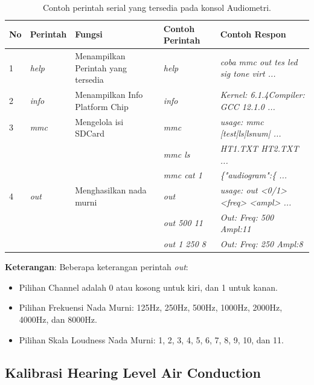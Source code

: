 \documentclass{article}
\begin{document}
	\begin{table}[H]
		\renewcommand{\tablename}{Tabel}
		\centering
		\caption{Contoh perintah serial yang tersedia pada konsol Audiometri.}
		\begin{tabular}{| p{} | p{} | p{} | p{} | p{} |}
			\hline
			\textbf{No} & \textbf{Perintah} & \textbf{Fungsi} & \textbf{Contoh Perintah} & \textbf{Contoh Respon} \\
			\hline
			1 & \textit{help} & Menampilkan Perintah yang tersedia & \textit{help} & \textit{coba mmc out tes led sig tone virt ...} \\
			\hline
			2 & \textit{info} & Menampilkan Info Platform Chip & \textit{info} & \textit{Kernel: 6.1.4Compiler: GCC 12.1.0 ...} \\
			\hline
			3 & \textit{mmc} & Mengelola isi SDCard & \textit{mmc} & \textit{usage: mmc [test|ls|lsnum| ...} \\
			& & & \textit{mmc ls} & \textit{HT1.TXT HT2.TXT ...} \\
			& & & \textit{mmc cat 1} & \textit{\{"audiogram":\{ ...} \\
			\hline
			4 & \textit{out} & Menghasilkan nada murni &  \textit{out} & \textit{usage: out <0/1> <freq> <ampl> ...} \\
			& & & \textit{out 500 11} & \textit{Out: Freq:  500 Ampl:11} \\
			& & & \textit{out 1 250 8} & \textit{Out: Freq:  250 Ampl:8} \\
			\hline
		\end{tabular}
	\end{table}

	\textbf{Keterangan}: Beberapa keterangan perintah \textit{out}:
	\begin{itemize}
		\item Pilihan Channel adalah 0 atau kosong untuk kiri, dan 1 untuk kanan.
		\item Pilihan Frekuensi Nada Murni: 125Hz, 250Hz, 500Hz, 1000Hz, 2000Hz, 4000Hz, dan 8000Hz.
		\item Pilihan Skala Loudness Nada Murni: 1, 2, 3, 4, 5, 6, 7, 8, 9, 10, dan 11.
	\end{itemize}

	\subsection{Kalibrasi Hearing Level Air Conduction}
\end{document}
